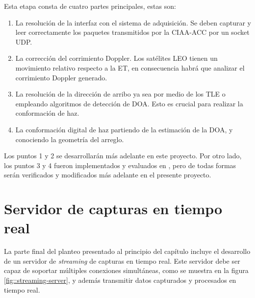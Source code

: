 \documentclass[../../main.tex]{subfiles}
\begin{document}
Esta etapa consta de cuatro partes principales, estas son:
\begin{enumerate}
    \item La resolución de la interfaz con el sistema de adquisición. Se deben capturar y leer correctamente los paquetes transmitidos por la CIAA-ACC por un socket UDP.
    \item La corrección del corrimiento Doppler. Los satélites LEO tienen un movimiento relativo respecto a la ET, en consecuencia habrá que analizar el corrimiento Doppler generado.
    \item La resolución de la dirección de arribo ya sea por medio de los TLE o empleando algoritmos de detección de DOA. Esto es crucial para realizar la conformación de haz.
    \item La conformación digital de haz partiendo de la estimación de la DOA, y conociendo la geometría del arreglo.
\end{enumerate}

Los puntos 1 y 2 se desarrollarán más adelante en este proyecto. Por otro lado, los puntos 3 y 4 fueron implementados y evaluados en \cite{proyecto-grigo}, pero de todas formas serán verificados y modificados más adelante en el presente proyecto.

\section{Servidor de capturas en tiempo real}
La parte final del planteo presentado al principio del capítulo incluye el desarrollo de un servidor de \textit{streaming} de capturas en tiempo real. Este servidor debe ser capaz de soportar múltiples conexiones simultáneas, como se muestra en la figura \ref{fig::streaming-server}, y además transmitir datos capturados y procesados en tiempo real. 

\end{document}
